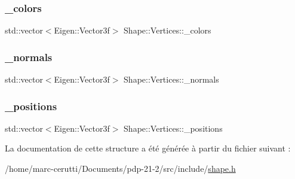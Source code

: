 \subsubsection{\texorpdfstring{\+\_\+colors}{\_colors}}
{\footnotesize\ttfamily std\+::vector$<$Eigen\+::\+Vector3f$>$ Shape\+::\+Vertices\+::\+\_\+colors}

\mbox{\label{struct_shape_1_1_vertices_aa258b760267bf6e5b316ac6ec11a2ea3}} 
\subsubsection{\texorpdfstring{\+\_\+normals}{\_normals}}
{\footnotesize\ttfamily std\+::vector$<$Eigen\+::\+Vector3f$>$ Shape\+::\+Vertices\+::\+\_\+normals}

\mbox{\label{struct_shape_1_1_vertices_aef6a4c183b595cffa5e890e3ba06c64d}} 
\subsubsection{\texorpdfstring{\+\_\+positions}{\_positions}}
{\footnotesize\ttfamily std\+::vector$<$Eigen\+::\+Vector3f$>$ Shape\+::\+Vertices\+::\+\_\+positions}



La documentation de cette structure a été générée à partir du fichier suivant \+:\begin{DoxyCompactItemize}
\item 
/home/marc-\/cerutti/\+Documents/pdp-\/21-\/2/src/include/\hyperlink{shape_8h}{shape.\+h}\end{DoxyCompactItemize}
